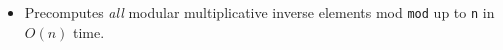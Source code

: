 \begin{itemize}
	\item Precomputes \textit{all} modular multiplicative inverse elements mod \lstinline{mod} up to \lstinline{n} in $O(n)$ time.
\end{itemize}

